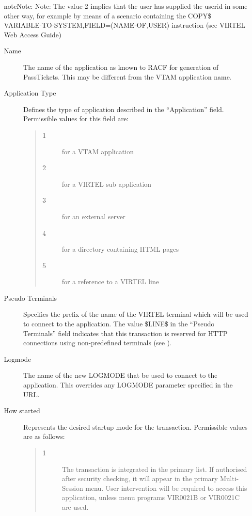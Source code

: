 \documentclass[letterpaper,10pt,english]{sphinxmanual}
\begin{document}
\begin{sphinxadmonition}{note}{Note:}
Note: The value 2 implies that the user has supplied the userid in some other way, for example by means of a scenario containing the COPY\$ VARIABLE-TO-SYSTEM,FIELD=(NAME-OF,USER) instruction (see VIRTEL Web Access Guide)
\end{sphinxadmonition}
\begin{description}
\item[{Name}] \leavevmode
The name of the application as known to RACF for generation of PassTickets. This may be different from the VTAM application name.

\item[{Application Type}] \leavevmode
Defines the type of application described in the “Application” field. Permissible values for this field are:
\begin{quote}
\begin{description}
\item[{1}] \leavevmode
for a VTAM application

\item[{2}] \leavevmode
for a VIRTEL sub-application

\item[{3}] \leavevmode
for an external server

\item[{4}] \leavevmode
for a directory containing HTML pages

\item[{5}] \leavevmode
for a reference to a VIRTEL line

\end{description}
\end{quote}

\item[{Pseudo Terminals}] \leavevmode
Specifies the prefix of the name of the VIRTEL terminal which will be used to connect to the application. The value \$LINE\$ in the “Pseudo Terminals” field indicates that this transaction is reserved for HTTP connections using non-predefined terminals (see {\hyperref[\detokenize{connectivity_guide:v457cn-forceluname}]{}}).

\item[{Logmode}] \leavevmode
The name of the new LOGMODE that  be used to connect to the application. This overrides any LOGMODE parameter specified in the URL.

\item[{How started}] \leavevmode
Represents the desired startup mode for the transaction. Permissible values are as follows:
\begin{quote}
\begin{description}
\item[{1}] \leavevmode
The transaction is integrated in the primary list. If authorised after security checking, it will appear in the primary Multi-Session menu. User intervention will be required to access this application, unless menu programs VIR0021B or VIR0021C are used.


\end{description}
\end{quote}
\end{description}
\end{document}
